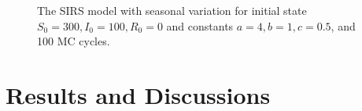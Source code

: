 \documentclass[10pt,showpacs,preprintnumbers,amsmath,amssymb,nofootinbib,aps,prl,twocolumn,groupedaddress,superscriptaddress,showkeys]{revtex4-1}
\begin{document}
\begin{figure}[h!tb]
  \\
  \\
  \caption{\label{fig:prob d}The SIRS model with seasonal variation for initial state $S_0=300, I_0=100, R_0=0$ and constants $a=4, b=1, c=0.5$, and 100 MC cycles.}
\end{figure}


\section{Results and Discussions}
\end{document}
